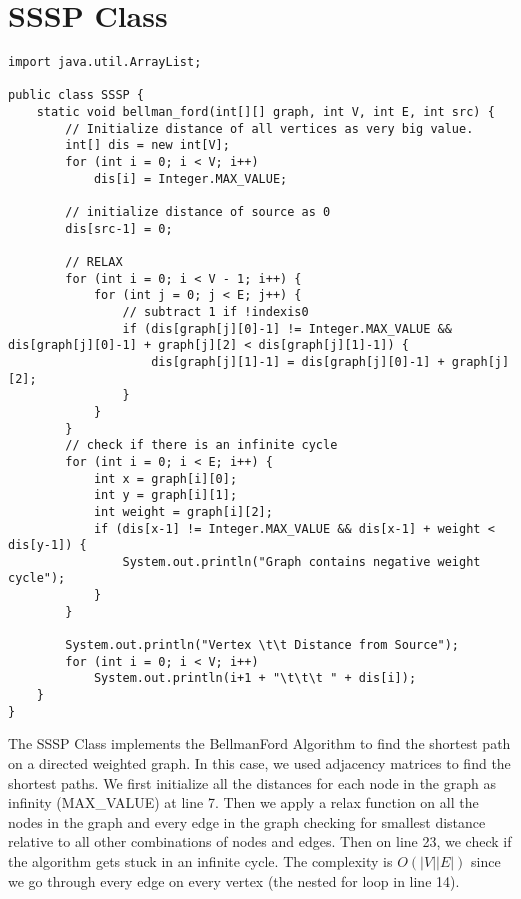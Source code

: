 \documentclass{article}
\begin{document}
\section{SSSP Class}
    \begin{lstlisting}
import java.util.ArrayList;

public class SSSP {
    static void bellman_ford(int[][] graph, int V, int E, int src) {
        // Initialize distance of all vertices as very big value.
        int[] dis = new int[V];
        for (int i = 0; i < V; i++)
            dis[i] = Integer.MAX_VALUE;

        // initialize distance of source as 0
        dis[src-1] = 0;

        // RELAX
        for (int i = 0; i < V - 1; i++) {
            for (int j = 0; j < E; j++) {
                // subtract 1 if !indexis0
                if (dis[graph[j][0]-1] != Integer.MAX_VALUE && dis[graph[j][0]-1] + graph[j][2] < dis[graph[j][1]-1]) {
                    dis[graph[j][1]-1] = dis[graph[j][0]-1] + graph[j][2];
                }
            }
        }
        // check if there is an infinite cycle
        for (int i = 0; i < E; i++) {
            int x = graph[i][0];
            int y = graph[i][1];
            int weight = graph[i][2];
            if (dis[x-1] != Integer.MAX_VALUE && dis[x-1] + weight < dis[y-1]) {
                System.out.println("Graph contains negative weight cycle");
            }
        }

        System.out.println("Vertex \t\t Distance from Source");
        for (int i = 0; i < V; i++)
            System.out.println(i+1 + "\t\t\t " + dis[i]);
    }
}

    \end{lstlisting}
    The SSSP Class implements the BellmanFord Algorithm to find the shortest path on a directed weighted graph.  In this case, we used adjacency matrices to find the shortest paths.  We first initialize all the distances for each node in the graph as infinity (MAX\_VALUE) at line 7.  Then we apply a relax function on all the nodes in the graph and every edge in the graph checking for smallest distance relative to all other combinations of nodes and edges.  Then on line 23, we check if the algorithm gets stuck in an infinite cycle.  The complexity is $O(|V||E|)$ since we go through every edge on every vertex (the nested for loop in line 14).


\newpage
\end{document}
